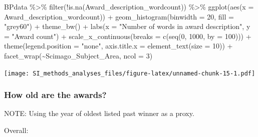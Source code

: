 \documentclass[
]{article}
\newenvironment{Shaded}{\begin{snugshade}}{\end{snugshade}}
\newcommand{\AttributeTok}[1]{\textcolor[rgb]{0.77,0.63,0.00}{#1}}
\newcommand{\DecValTok}[1]{\textcolor[rgb]{0.00,0.00,0.81}{#1}}
\newcommand{\FunctionTok}[1]{\textcolor[rgb]{0.00,0.00,0.00}{#1}}
\newcommand{\NormalTok}[1]{#1}
\newcommand{\SpecialCharTok}[1]{\textcolor[rgb]{0.00,0.00,0.00}{#1}}
\newcommand{\StringTok}[1]{\textcolor[rgb]{0.31,0.60,0.02}{#1}}
\begin{document}
\begin{Shaded}
\begin{Highlighting}[]
\NormalTok{BPdata }\SpecialCharTok{\%\textgreater{}\%} 
  \FunctionTok{filter}\NormalTok{(}\SpecialCharTok{!}\FunctionTok{is.na}\NormalTok{(Award\_description\_wordcount)) }\SpecialCharTok{\%\textgreater{}\%}
  \FunctionTok{ggplot}\NormalTok{(}\FunctionTok{aes}\NormalTok{(}\AttributeTok{x =}\NormalTok{ Award\_description\_wordcount)) }\SpecialCharTok{+} 
  \FunctionTok{geom\_histogram}\NormalTok{(}\AttributeTok{binwidth =} \DecValTok{20}\NormalTok{, }\AttributeTok{fill =} \StringTok{"grey60"}\NormalTok{) }\SpecialCharTok{+}
  \FunctionTok{theme\_bw}\NormalTok{() }\SpecialCharTok{+} 
  \FunctionTok{labs}\NormalTok{(}\AttributeTok{x =} \StringTok{"Number of words in award description"}\NormalTok{, }\AttributeTok{y =} \StringTok{"Award count"}\NormalTok{) }\SpecialCharTok{+} 
  \FunctionTok{scale\_x\_continuous}\NormalTok{(}\AttributeTok{breaks =} \FunctionTok{c}\NormalTok{(}\FunctionTok{seq}\NormalTok{(}\DecValTok{0}\NormalTok{, }\DecValTok{1000}\NormalTok{, }\AttributeTok{by =} \DecValTok{100}\NormalTok{))) }\SpecialCharTok{+}
  \FunctionTok{theme}\NormalTok{(}\AttributeTok{legend.position =} \StringTok{"none"}\NormalTok{, }\AttributeTok{axis.title.x =} \FunctionTok{element\_text}\NormalTok{(}\AttributeTok{size =} \DecValTok{10}\NormalTok{)) }\SpecialCharTok{+} 
  \FunctionTok{facet\_wrap}\NormalTok{(}\SpecialCharTok{\textasciitilde{}}\NormalTok{Scimago\_Subject\_Area, }\AttributeTok{ncol =} \DecValTok{3}\NormalTok{)}
\end{Highlighting}
\end{Shaded}

\texttt{[image: SI\_methods\_analyses\_files/figure-latex/unnamed-chunk-15-1.pdf]}

\hypertarget{how-old-are-the-awards}{%
\subsubsection{How old are the awards?}\label{how-old-are-the-awards}}

NOTE: Using the year of oldest listed past winner as a proxy.

Overall:
\end{document}
